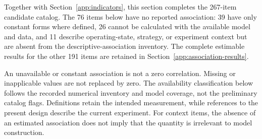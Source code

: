 Together with Section~\ref{app:indicators}, this section completes the 267-item candidate catalog. The 76 items below have no reported association: 39 have only constant forms where defined, 26 cannot be calculated with the available model and data, and 11 describe operating-state, strategy, or experiment context but are absent from the descriptive-association inventory. The complete estimable results for the other 191 items are retained in Section~\ref{app:association-results}.

An unavailable or constant association is not a zero correlation. Missing or inapplicable values are not replaced by zero. The availability classification below follows the recorded numerical inventory and model coverage, not the preliminary catalog flags. Definitions retain the intended measurement, while references to the present design describe the current experiment. For context items, the absence of an estimated association does not imply that the quantity is irrelevant to model construction.

\begingroup\small\setlength{\tabcolsep}{3pt}\renewcommand{\arraystretch}{1.07}

